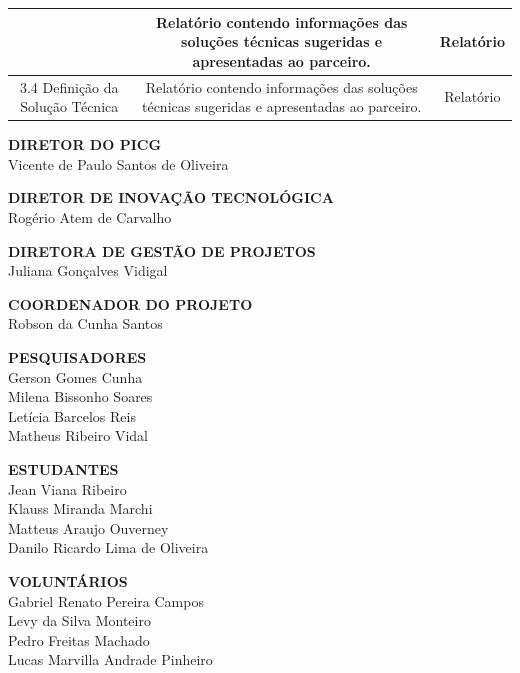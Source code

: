 \begin{center}
\begin{center}
\begin{tabular}{|c|c|c|}
        & \multicolumn{1}{m{5cm}|}{
            Relatório contendo informações das soluções técnicas sugeridas e apresentadas ao parceiro.
        }
        & \multicolumn{1}{m{5cm}|}{
        \centering
            Relatório
        } \\
        \hline
        \multicolumn{1}{|m{5cm}|}{3.4 Definição da Solução Técnica} 
        & \multicolumn{1}{m{5cm}|}{
            Relatório contendo informações das soluções técnicas sugeridas e apresentadas ao parceiro.
        }
        & \multicolumn{1}{m{5cm}|}{
        \centering
            Relatório
        } \\
        \hline
    \end{tabular}
\end{center}


    \newpage

    \vfill
    \textbf{DIRETOR DO PICG}\\
    Vicente de Paulo Santos de Oliveira
    \vfill
    
    \textbf{DIRETOR DE INOVAÇÃO TECNOLÓGICA}\\
    Rogério Atem de Carvalho
    \vfill
    
    \textbf{DIRETORA DE GESTÃO DE PROJETOS}\\
    Juliana Gonçalves Vidigal
    \vfill
    
    \textbf{COORDENADOR DO PROJETO}\\
    Robson da Cunha Santos
    \vfill
    
    \textbf{PESQUISADORES}\\
    Gerson Gomes Cunha\\
    Milena Bissonho Soares\\
    Letícia Barcelos Reis \\
    Matheus Ribeiro Vidal
    \vfill
    
    \textbf{ESTUDANTES}\\
    Jean Viana Ribeiro \\
    Klauss Miranda Marchi \\
    Matteus Araujo Ouverney\\
    Danilo Ricardo Lima de Oliveira
    \vfill

    \textbf{VOLUNTÁRIOS}\\
    Gabriel Renato Pereira Campos\\
    Levy da Silva Monteiro\\
    Pedro Freitas Machado\\
    Lucas Marvilla Andrade Pinheiro
    \vfill
\end{center}